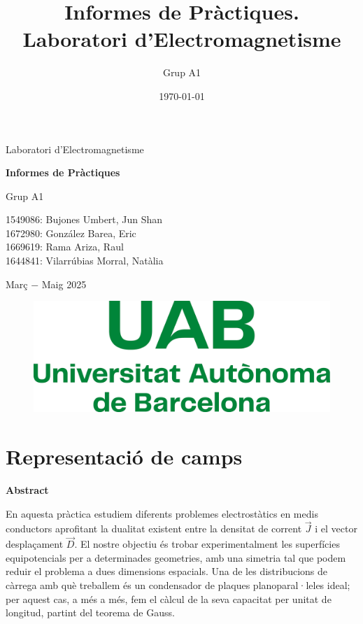 \documentclass[a4paper,10.5pt]{report}
\title{\textbf{\huge{Informes de Pràctiques. \\ \vspace{0.2cm} Laboratori d'Electromagnetisme}}}
\author{Grup A1}
\date{\today}
\newenvironment{chapterabstract}{
	\begin{center}
		\bfseries Abstract
	\end{center}
	\quotation
}{\endquotation}
\begin{document}
	
\begin{titlepage}
	\centering
	{\LARGE Laboratori d'Electromagnetisme \par}
	\vspace{2cm}
	{\Huge \textbf{Informes de Pràctiques} \par}
	\vspace{3cm}
	{\Large Grup A1 \par}
	\vspace{0.5cm}
	{\Large 1549086: Bujones Umbert, Jun Shan\\ 1672980: González Barea, Eric\\1669619: Rama Ariza, Raul\\1644841: Vilarrúbias Morral, Natàlia \par}
	\vspace{2cm}
	{\Large Març $-$ Maig 2025 \par}
	\vspace{2cm}
	
	\begin{figure}[h]
		\centering
		\includegraphics[width=0.3\linewidth]{screenshot001}
		\label{fig:screenshot001}
	\end{figure}
\end{titlepage}

\tableofcontents
\newpage

\chapter{Representació de camps} 

\begin{chapterabstract}
	En aquesta pràctica estudiem diferents problemes electrostàtics en medis conductors aprofitant la dualitat existent entre la densitat de corrent $\vec{J}$ i el vector desplaçament $\vec{D}$. El nostre objectiu és trobar experimentalment les superfícies equipotencials per a determinades geometries, amb una simetria tal que podem reduir el problema a dues dimensions espacials. Una de les distribucions de càrrega amb què treballem és un condensador de plaques planoparal·leles ideal; per aquest cas, a més a més, fem el càlcul de la seva capacitat per unitat de longitud, partint del teorema de Gauss.
\end{chapterabstract}
\end{document}
